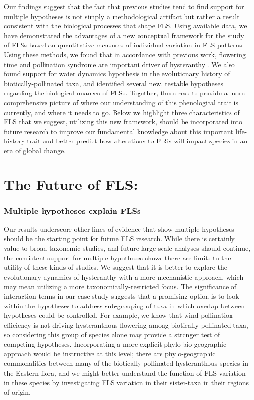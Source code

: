 \documentclass{article}
\begin{document}
\noindent Our findings suggest that the fact that previous studies tend to find support for multiple hypotheses \citep{Bolmgren2003,Gougherty2018,Savage2019} is not simply a methodological artifact but rather a result consistent with the biological processes that shape FLS. Using available data, we have demonstrated the advantages of a new conceptual framework for the study of FLSs based on quantitative measures of individual variation in FLS patterns. Using these methods, we found that in accordance with previous work, flowering time and pollination syndrome are important driver of hysteranthy \citep{Gougherty2018}. We also found support for water dynamics hypothesis in the evolutionary history of biotically-pollinated taxa, and identified several new, testable hypotheses regarding the biological nuances of FLSs. Together, these results provide a more comprehensive picture of where our understanding of this phenological trait is currently, and where it needs to go. Below we highlight three characteristics of FLS that we suggest, utilizing this new framework, should be incorporated into future research to improve our fundamental knowledge about this important life-history trait and better predict how alterations to FLSs will impact species in an era of global change.
\section*{The Future of FLS:}
\subsubsection*{Multiple hypotheses explain FLSs}

\noindent Our results underscore other lines of evidence that show multiple hypotheses should be the starting point for future FLS research. While there is certainly value to broad taxonomic studies, and future large-scale analyses should continue, the consistent support for multiple hypotheses shows there are limits to the utility of these kinds of studies. We suggest that it is better to explore the evolutionary dynamics of hysteranthy with a more mechanistic approach, which may mean utilizing a more taxonomically-restricted focus. The significance of interaction terms in our case study suggests that a promising option is to look within the hypotheses to address sub-grouping of taxa in which overlap between hypotheses could be controlled. For example, we know that wind-pollination efficiency is not driving hysteranthous flowering among biotically-pollinated taxa, so considering this group of species alone may provide a stronger test of competing hypotheses. Incorporating a more explicit phylo-bio-geographic approach would be instructive at this level; there are phylo-geographic commonalities between many of the biotically-pollinated hysteranthous species in the Eastern flora, and we might better understand the function of FLS variation in these species by investigating FLS variation in their sister-taxa in their regions of origin.\\ 
\end{document}
